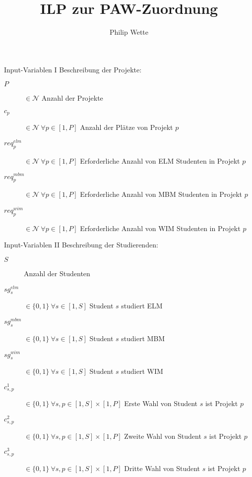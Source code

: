 \documentclass[11pt]{beamer}
\author{Philip Wette}
\title{ILP zur PAW-Zuordnung}
\begin{document}
\begin{frame}
\titlepage
\end{frame}


\begin{frame}{Input-Variablen I}
Beschreibung der Projekte:
\begin{description}
\item[$P$] $\in \mathcal{N}$ Anzahl der Projekte \\
\item[$c_p$] $\in \mathcal{N} ~ \forall p \in \left[1, P\right]$ Anzahl der Plätze von Projekt $p$ \\
\item[$req^{elm}_p$] $\in \mathcal{N} ~ \forall p \in \left[1, P\right]$ Erforderliche Anzahl von ELM Studenten in Projekt $p$ \\
\item[$req^{mbm}_p$] $\in \mathcal{N} ~ \forall p \in \left[1, P\right]$ Erforderliche Anzahl von MBM Studenten in Projekt $p$ \\
\item[$req^{wim}_p$] $\in \mathcal{N} ~ \forall p \in \left[1, P\right]$ Erforderliche Anzahl von WIM Studenten in Projekt $p$ \\
\end{description}
\end{frame}

\begin{frame}{Input-Variablen II}
Beschreibung der Studierenden:
\begin{description}
\item[$S$] Anzahl der Studenten \\
\item[$sg^{elm}_s$] $\in \{0, 1\} ~ \forall s \in \left[1, S\right]$ Student $s$ studiert ELM \\
\item[$sg^{mbm}_s$] $\in \{0, 1\} ~ \forall s \in \left[1, S\right]$ Student $s$ studiert MBM \\
\item[$sg^{wim}_s$] $\in \{0, 1\} ~ \forall s \in \left[1, S\right]$ Student $s$ studiert WIM \\
\item[$c^{1}_{s,p}$] $\in \{0, 1\} ~ \forall s,p \in \left[1, S\right] \times \left[1, P\right]$ Erste Wahl von Student $s$ ist Projekt $p$ \\
\item[$c^{2}_{s,p}$] $\in \{0, 1\} ~ \forall s,p \in \left[1, S\right] \times \left[1, P\right]$ Zweite Wahl von Student $s$ ist Projekt $p$ \\
\item[$c^{3}_{s,p}$] $\in \{0, 1\} ~ \forall s,p \in \left[1, S\right] \times \left[1, P\right]$ Dritte Wahl von Student $s$ ist Projekt $p$ \\
\end{description}
\end{frame}
\end{document}
